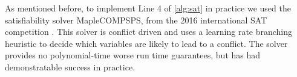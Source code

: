 \documentclass[11pt]{article}
\begin{document}
As mentioned before, to implement Line 4 of \autoref{alg:sat} in
practice we used the satisfiability solver MapleCOMPSPS, from the 2016
international SAT competition \cite{bhj17,lgpc16}.  This solver is
conflict driven and uses a learning rate branching heuristic to decide
which variables are likely to lead to a conflict.  The solver provides
no polynomial-time worse run time guarantees, but has had
demonstratable success in practice.

  
  
  
\end{document}
